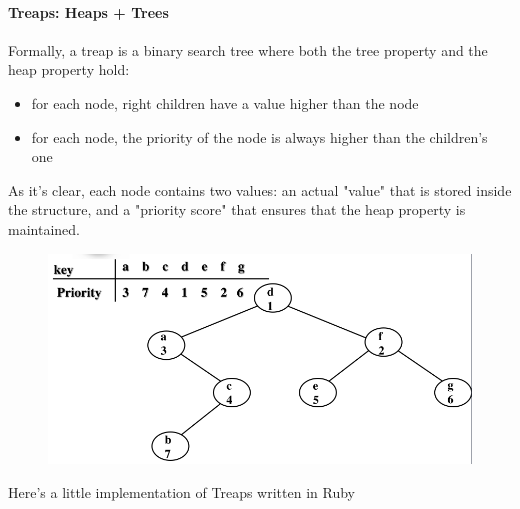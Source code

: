 \documentclass{article}
\begin{document}
				\paragraph{Treaps: Heaps + Trees}
					Formally, a treap is a binary search tree where both the tree property and the heap property hold:
					\begin{itemize}
						\item for each node, right children have a value higher than the node
						\item for each node, the priority of the node is always higher than the children's one
					\end{itemize}
					As it's clear, each node contains two values: an actual "value" that is stored inside the structure, and a "priority score" that ensures that the heap property is maintained.
					\begin{figure}[H]
						\centering
						\includegraphics[width = \textwidth]{./images/treap1.png}
					\end{figure}
					Here's a little implementation of Treaps written in Ruby
\end{document}
